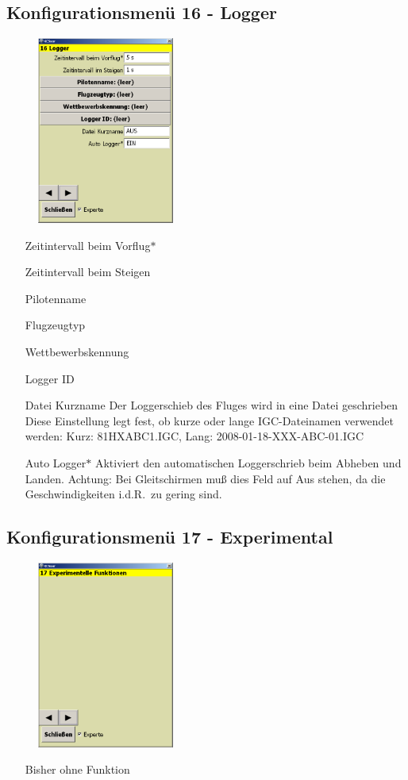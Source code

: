 \subsection{Konfigurationsmenü 16 - Logger}\label{Konfig16}
\begin{figure}
\includegraphics[width=4.5cm]{Bilder/Konfig16Logger.png}
\end{figure}
\begin{enumerate}
\item[Zeitintervall beim Vorflug$\ast$]
\item[Zeitintervall beim Steigen]
\item[Pilotenname]
\item[Flugzeugtyp]
\item[Wettbewerbskennung]
\item[Logger ID]
\item[Datei Kurzname] Der Loggerschieb des Fluges wird in eine Datei geschrieben
Diese Einstellung legt fest, ob kurze oder lange IGC-Dateinamen verwendet werden:
Kurz: 81HXABC1.IGC,  Lang: 2008-01-18-XXX-ABC-01.IGC
\item[Auto Logger$\ast$] Aktiviert den automatischen Loggerschrieb beim Abheben und Landen. Achtung: Bei Gleitschirmen muß dies Feld auf Aus stehen, da die Geschwindigkeiten i.d.R.\ zu gering sind.
\end{enumerate}

\subsection{Konfigurationsmenü 17 - Experimental}\label{Konfig17}
\begin{figure}
\includegraphics[width=4.5cm]{Bilder/Konfig17Experimental.png}
\end{figure}
\begin{enumerate}
\item[Bisher ohne Funktion]
\end{enumerate} 